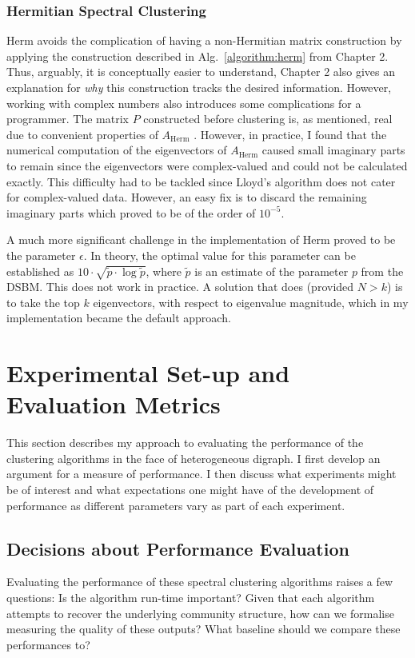 \subsubsection{Hermitian Spectral Clustering}
Herm avoids the complication of having a non-Hermitian matrix construction
by applying the construction described in Alg.\ \ref{algorithm:herm} from Chapter 2. Thus, 
arguably, it is conceptually easier to understand, Chapter 2 also gives an explanation for \emph
{why} this construction tracks the desired information. However, working with complex numbers also 
introduces some complications for a programmer. The matrix $P$ constructed before clustering is, 
as mentioned, real due to convenient properties of $A_\mathrm{Herm}$ \cite{lucapaper}. %
However, in practice, I found that the numerical computation of the eigenvectors of 
$A_\mathrm{Herm}$ caused small imaginary parts to remain since the eigenvectors were complex-valued
and could not be calculated exactly. This difficulty had to be tackled since Lloyd's algorithm
does not cater for complex-valued data. However, an easy fix is to discard the remaining imaginary 
parts which proved to be of the order of $10^{-5}$. 

A much more significant challenge in the implementation of Herm proved to be the parameter $\epsilon$. In theory, the optimal value for this 
parameter can be established as $10 \cdot \sqrt{\tilde p \cdot \log\tilde p}$, where $\tilde p$ 
is an estimate of the parameter $p$ from the DSBM. This does not work in practice. A solution that 
does (provided $N > k$) is to take the top $k$ eigenvectors, with respect to 
eigenvalue magnitude, which in my implementation became the default approach.

\section{Experimental Set-up and Evaluation Metrics}

This section describes my approach to evaluating the performance of the clustering algorithms in 
the face of heterogeneous digraph. I first develop an argument for a measure of performance. I then discuss 
what experiments might be of interest and what expectations one might have of the development of 
performance as different parameters vary as part of each experiment. 

\subsection{Decisions about Performance Evaluation}
Evaluating the performance of these spectral clustering algorithms raises a few questions: Is the 
algorithm run-time important? Given that each algorithm attempts to recover the underlying 
community structure, how can we formalise measuring the quality of these outputs? What baseline 
should we compare these performances to?

